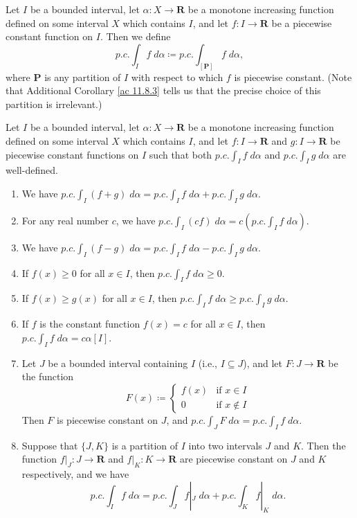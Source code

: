 \begin{additional corollary}\label{ac 11.8.4}
Let \(I\) be a bounded interval, let \(\alpha : X \to \mathbf{R}\) be a monotone increasing function defined on some interval \(X\) which contains \(I\), and let \(f : I \to \mathbf{R}\) be a piecewise constant function on \(I\).
Then we define
\[
    p.c. \int_I f \; d \alpha \coloneqq p.c. \int_{[\mathbf{P}]} f \; d \alpha,
\]
where \(\mathbf{P}\) is any partition of \(I\) with respect to which \(f\) is piecewise constant.
(Note that Additional Corollary \ref{ac 11.8.3} tells us that the precise choice of this partition is irrelevant.)
\end{additional corollary}

\begin{additional corollary}\label{ac 11.8.5}
Let \(I\) be a bounded interval, let \(\alpha : X \to \mathbf{R}\) be a monotone increasing function defined on some interval \(X\) which contains \(I\), and let \(f : I \to \mathbf{R}\) and \(g : I \to \mathbf{R}\) be piecewise constant functions on \(I\) such that both \(p.c. \int_I f \; d \alpha\) and \(p.c. \int_I g \; d \alpha\) are well-defined.
\begin{enumerate}
    \item We have \(p.c. \int_I (f + g) \; d \alpha = p.c. \int_I f \; d \alpha + p.c. \int_I g \; d \alpha\).
    \item For any real number \(c\), we have \(p.c. \int_I (cf) \; d \alpha = c (p.c. \int_I f \; d \alpha)\).
    \item We have \(p.c. \int_I (f - g) \; d \alpha = p.c. \int_I f \; d \alpha - p.c. \int_I g \; d \alpha\).
    \item If \(f(x) \geq 0\) for all \(x \in I\), then \(p.c. \int_I f \; d \alpha \geq 0\).
    \item If \(f(x) \geq g(x)\) for all \(x \in I\), then \(p.c. \int_I f \; d \alpha \geq p.c. \int_I g \; d \alpha\).
    \item If \(f\) is the constant function \(f(x) = c\) for all \(x \in I\), then \(p.c. \int_I f \; d \alpha = c \alpha[I]\).
    \item Let \(J\) be a bounded interval containing \(I\) (i.e., \(I \subseteq J\)), and let \(F : J \to \mathbf{R}\) be the function
          \[
              F(x) \coloneqq \begin{cases}
                  f(x) & \text{if } x \in I    \\
                  0    & \text{if } x \notin I
              \end{cases}
          \]
          Then \(F\) is piecewise constant on \(J\), and \(p.c. \int_J F \; d \alpha = p.c. \int_I f \; d \alpha\).
    \item Suppose that \(\{J, K\}\) is a partition of \(I\) into two intervals \(J\) and \(K\).
          Then the function \(f|_J : J \to \mathbf{R}\) and \(f|_K : K \to \mathbf{R}\) are piecewise constant on \(J\) and \(K\) respectively, and we have
          \[
              p.c. \int_I f \; d \alpha = p.c. \int_J f|_J \; d \alpha + p.c. \int_K f|_K \; d \alpha.
          \]
\end{enumerate}
\end{additional corollary}

